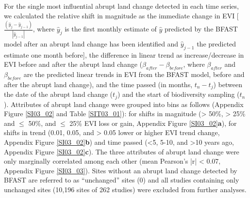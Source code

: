 For the single most influential abrupt land change detected in each time series, we calculated the relative shift in magnitude as the immediate change in EVI [$ \frac{(\hat{y}_{j} - \hat{y}_{j-1} )}{|\hat{y}_{j-1}|}$, where  $\hat{y}_{j}$ is the first monthly estimate of $\hat{y}$ predicted by the BFAST model after an abrupt land change has been identified and $\hat{y}_{j-1}$ the predicted estimate one month before], the difference in linear trend as increase/decrease in EVI before and after the abrupt land change ($\beta_{after}-\beta_{before}$, where $\beta_{after}$ and $\beta_{before}$ are the predicted linear trends in EVI from the BFAST model, before and after the abrupt land change), and the time passed (in months, $t_{n} - t_{j}$) between the date of the abrupt land change ($t_{j}$) and the start of biodiversity sampling ($t_{n}$). Attributes of abrupt land change were grouped into bins as follows (Appendix Figure \ref{SI03_02} and Table \ref{SIT03_01}): for shifts in magnitude (> 50\%, > 25\% and $\leq$ 50\%, and $\leq$ 25\% EVI loss or gain, Appendix Figure \ref{SI03_02}\textbf{a}), for shifts in trend (0.01, 0.05, and > 0.05 lower or higher EVI trend change, Appendix Figure \ref{SI03_02}\textbf{b}) and time passed (<5, 5-10, and >10 years ago, Appendix Figure \ref{SI03_02}\textbf{c}). The three attributes of abrupt land change were only marginally correlated among each other (mean Pearson’s |r| < 0.07, Appendix Figure \ref{SI03_03}). Sites without an abrupt land change detected by BFAST are referred to as “unchanged” sites (0) and all studies containing only unchanged sites (10,196 sites of 262 studies) were excluded from further analyses.

